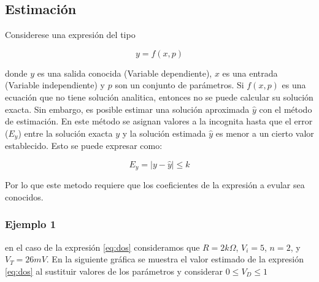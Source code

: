 \documentclass[letterpaper,14pt,english]{/usr/lib/python3.3/site-packages/sphinx/texinputs/sphinxhowto}
\begin{document}
\subsection{Estimación}

Considerese una expresión del tipo

\begin{equation}\label{eq:idea1}
y=f(x,p)
\end{equation}

donde $y$ es una salida conocida (Variable dependiente), $x$ es una
entrada (Variable independiente) y $p$ son un conjunto de parámetros. Si
$f(x,p)$ es una ecuación que no tiene solución analitica, entonces no se
puede calcular su solución exacta. Sin embargo, es posible estimar una
solución aproximada $\hat{y}$ con el método de estimación. En este
método se asignan valores a la incognita hasta que el error ($E_{y}$)
entre la solución exacta $y$ y la solución estimada $\hat{y}$ es menor a
un cierto valor establecido. Esto se puede expresar como:

\[
E_{y}=\vert y-\hat{y}\vert \leq k
\]

Por lo que este metodo requiere que los coeficientes de la expresión a
evular sea conocidos.

\subsubsection{Ejemplo 1}

en el caso de la expresión \eqref{eq:dos} consideramos que $R=2k\Omega$,
$V_{i}=5$, $n=2$, y $V_{T}=26mV$. En la siguiente gráfica se muestra el
valor estimado de la expresión \eqref{eq:dos} al sustituir valores de
los parámetros y considerar $0\leq V_{D} \leq 1$

\end{document}
